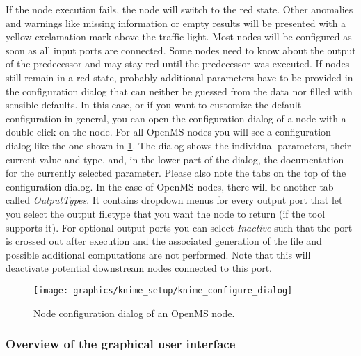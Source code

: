 If the node execution fails, the node will switch to the red state. Other anomalies and warnings like missing information or empty results 
will be presented with a yellow exclamation mark above the traffic light.
Most nodes will be configured as soon as all input ports are connected. Some nodes need to know about the output of the predecessor and may stay red until the predecessor was executed.
If nodes still remain in a red state, probably additional parameters have to be provided in the configuration dialog that can neither be guessed from the data nor filled with sensible defaults.
In this case, or if you want to customize the default configuration in general, you can open the configuration dialog of a node with a double-click on the node.
For all OpenMS nodes you will see a configuration dialog like the one shown in \cref{fig:knime_configure}.
The dialog shows the individual parameters, their current value and type, and, in the lower part of the dialog, the 
documentation for the currently selected parameter. Please also note the tabs on the top of the configuration dialog. 
In the case of OpenMS nodes, there will be another tab called \textit{OutputTypes}. It contains dropdown menus for 
every output port that let you select the output filetype that you want the node to return (if the tool supports 
it). For optional output ports you can select \textit{Inactive} such that the port is crossed out after execution and 
the associated generation of the file and possible additional computations are not performed. Note that this will 
deactivate potential downstream nodes connected to this port.

\begin{figure}
\centering
\texttt{[image: graphics/knime\_setup/knime\_configure\_dialog]}
\caption{Node configuration dialog of an OpenMS node.}
\label{fig:knime_configure}
\end{figure}

\subsubsection{Overview of the graphical user interface}


